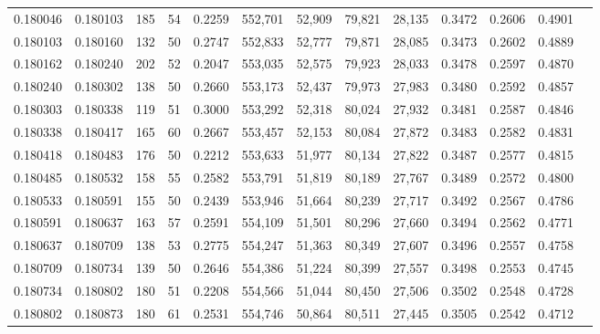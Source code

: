 \begin{tabular}{rrrrrrrrrrrrr}
0.180046 & 0.180103 &   185 &  54 &                                     0.2259 & 552,701 &  52,909 &  79,821 &  28,135 & 0.3472 & 0.2606 & 0.4901 \\
0.180103 & 0.180160 &   132 &  50 &                                     0.2747 & 552,833 &  52,777 &  79,871 &  28,085 & 0.3473 & 0.2602 & 0.4889 \\
0.180162 & 0.180240 &   202 &  52 &                                     0.2047 & 553,035 &  52,575 &  79,923 &  28,033 & 0.3478 & 0.2597 & 0.4870 \\
0.180240 & 0.180302 &   138 &  50 &                                     0.2660 & 553,173 &  52,437 &  79,973 &  27,983 & 0.3480 & 0.2592 & 0.4857 \\
0.180303 & 0.180338 &   119 &  51 &                                     0.3000 & 553,292 &  52,318 &  80,024 &  27,932 & 0.3481 & 0.2587 & 0.4846 \\
0.180338 & 0.180417 &   165 &  60 &                                     0.2667 & 553,457 &  52,153 &  80,084 &  27,872 & 0.3483 & 0.2582 & 0.4831 \\
0.180418 & 0.180483 &   176 &  50 &                                     0.2212 & 553,633 &  51,977 &  80,134 &  27,822 & 0.3487 & 0.2577 & 0.4815 \\
0.180485 & 0.180532 &   158 &  55 &                                     0.2582 & 553,791 &  51,819 &  80,189 &  27,767 & 0.3489 & 0.2572 & 0.4800 \\
0.180533 & 0.180591 &   155 &  50 &                                     0.2439 & 553,946 &  51,664 &  80,239 &  27,717 & 0.3492 & 0.2567 & 0.4786 \\
0.180591 & 0.180637 &   163 &  57 &                                     0.2591 & 554,109 &  51,501 &  80,296 &  27,660 & 0.3494 & 0.2562 & 0.4771 \\
0.180637 & 0.180709 &   138 &  53 &                                     0.2775 & 554,247 &  51,363 &  80,349 &  27,607 & 0.3496 & 0.2557 & 0.4758 \\
0.180709 & 0.180734 &   139 &  50 &                                     0.2646 & 554,386 &  51,224 &  80,399 &  27,557 & 0.3498 & 0.2553 & 0.4745 \\
0.180734 & 0.180802 &   180 &  51 &                                     0.2208 & 554,566 &  51,044 &  80,450 &  27,506 & 0.3502 & 0.2548 & 0.4728 \\
0.180802 & 0.180873 &   180 &  61 &                                     0.2531 & 554,746 &  50,864 &  80,511 &  27,445 & 0.3505 & 0.2542 & 0.4712 \\

\end{tabular}
